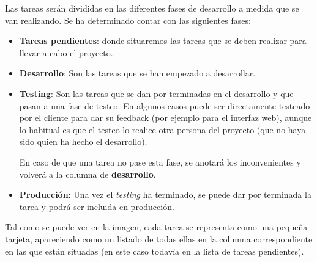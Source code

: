 \documentclass{\ClassPath/viu-tfm-template}
\begin{document}
Las tareas serán divididas en las diferentes fases de desarrollo a medida que se van realizando. Se ha determinado contar con las siguientes fases:


\begin{minipage}{0.60\linewidth}
    \begin{itemize}
        \item \textbf{Tareas pendientes}: donde situaremos las tareas que se deben realizar para llevar a cabo el proyecto.
        \item \textbf{Desarrollo}: Son las tareas que se han empezado a desarrollar.
        \item \textbf{Testing}: Son las tareas que se dan por terminadas en el desarrollo y que pasan a una fase de testeo. En algunos casos puede ser directamente testeado por el cliente para dar su feedback (por ejemplo para el interfaz web), aunque lo habitual es que el testeo lo realice otra persona del proyecto (que no haya sido quien ha hecho el desarrollo).

        En caso de que una tarea no pase esta fase, se anotará los inconvenientes y volverá a la columna de \textbf{desarrollo}.
        \item \textbf{Producción}: Una vez el \textit{testing} ha terminado, se puede dar por terminada la tarea y podrá ser incluida en producción.
    \end{itemize}

    Tal como se puede ver en la imagen, cada tarea se representa como una pequeña tarjeta, apareciendo como un listado de todas ellas en la columna correspondiente en las que están situadas (en este caso todavía en la lista de tareas pendientes).
\end{minipage}
\hfill
\end{document}
